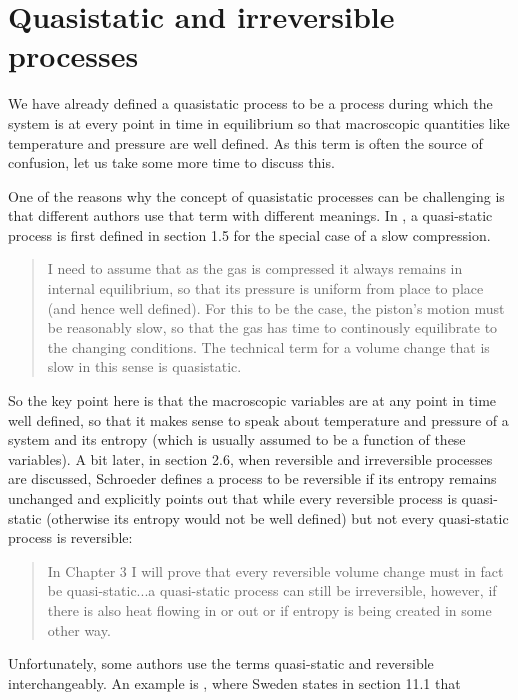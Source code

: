 \documentclass[a4paper, draft]{article}
\theoremstyle{own}
\theoremstyle{remark}
\begin{document}
\section{Quasistatic and irreversible processes}

We have already defined a quasistatic process to be a process during which the system is at every point in time in equilibrium so that macroscopic quantities like temperature and pressure are well defined. As this term is often the source of confusion, let us take some more time to discuss this.

One of the reasons why the concept of quasistatic processes can be challenging is that different authors use that term with different meanings. In \cite{Schroeder}, a quasi-static process is first defined in section 1.5 for the special case of a slow compression.

\begin{quote}
I need to assume that as the gas is compressed it always remains in internal equilibrium, so that its pressure is uniform from place to place (and hence well defined). For this to be the case, the piston's motion must be reasonably slow, so that the gas has time to continously equilibrate to the changing conditions. The technical term for a volume change that is slow in this sense is quasistatic.
\end{quote}

So the key point here is that the macroscopic variables are at any point in time well defined, so that it makes sense to speak about temperature and pressure of a system and its entropy (which is usually assumed to be a function of these variables). A bit later, in section 2.6, when reversible and irreversible processes are discussed, Schroeder defines a process to be reversible if its entropy remains unchanged and explicitly points out that while every reversible process is quasi-static (otherwise its entropy would not be well defined) but not every quasi-static process is reversible:

\begin{quote}
	In Chapter 3 I will prove that every reversible volume change must in fact be quasi-static...a quasi-static process can still be irreversible, however, if there is also heat flowing in or out or if  entropy is being created in some other way.
\end{quote}

Unfortunately, some authors use the terms quasi-static and reversible interchangeably. An example is \cite{Sweden}, where Sweden states in section 11.1 that
\end{document}
